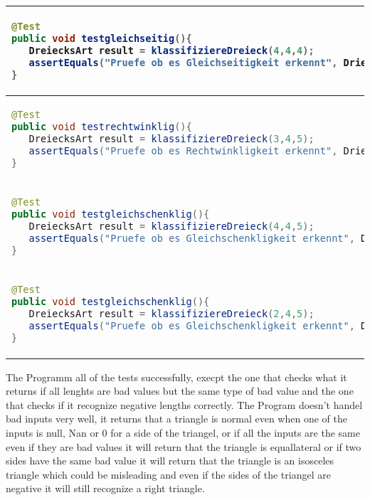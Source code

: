 \begin{parlist}
\begin{center}
\begin{makebox}[\linewidth]
\begin{longtable}[c]{ | p{12cm} | p{4cm} | }
\begin{lstlisting}[language=java,frame=trBL]
@Test
public void testgleichseitig(){
   DreiecksArt result = klassifiziereDreieck(4,4,4);
   assertEquals("Pruefe ob es Gleichseitigkeit erkennt", DriecksArt.Gliechseitig, result);
}
  \end{lstlisting} & testing branch 2 \\ 
\hline
  \begin{lstlisting}[language=java,frame=trBL]
@Test
public void testrechtwinklig(){
   DreiecksArt result = klassifiziereDreieck(3,4,5);
   assertEquals("Pruefe ob es Rechtwinkligkeit erkennt", DriecksArt.Rechtwinklig, result);
}
  \end{lstlisting} & Testing Branch 4 \\ 
  \hline
  \begin{lstlisting}[language=java,frame=trBL]
@Test
public void testgleichschenklig(){
   DreiecksArt result = klassifiziereDreieck(4,4,5);
   assertEquals("Pruefe ob es Gleichschenkligkeit erkennt", DriecksArt.Gleichschenklig, result);
}
  \end{lstlisting} &  Testing branch 3 \\ 
  \hline
  \begin{lstlisting}[language=java,frame=trBL]
@Test
public void testgleichschenklig(){
   DreiecksArt result = klassifiziereDreieck(2,4,5);
   assertEquals("Pruefe ob es Gleichschenkligkeit erkennt", DriecksArt.Gleichschenklig, result);
}
  \end{lstlisting} &  Testing branch 1 \\
  \hline
\end{longtable}
\end{makebox}
\end{center}

\item The Programm all of the tests successfully, execpt the one that checks what it returns if all lenghts are bad values but the same type of bad value and the one that checks if it recognize negative lengths correctly. The Program doesn't handel bad inputs very well, it returns that a triangle is normal even when one of the inputs is null, Nan or 0 for a side of the triangel, or if all the inputs are the same even if they are bad values it will return that the triangle is equallateral or if two sides have the same bad value it will return that the triangle is an isosceles triangle which could be misleading and even if the sides of the triangel are negative it will still recognize a right triangle.


\end{parlist}
